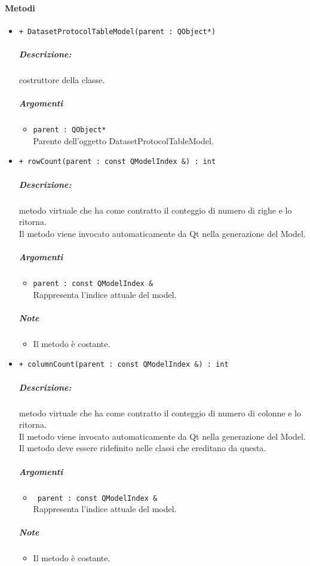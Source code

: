 \paragraph{\color{black}Metodi\\}
\begin{itemize}
	\item \color{blue}\verb!+ DatasetProtocolTableModel(parent : QObject*)!\\
		\color{black}
		\subparagraph{Descrizione:} costruttore della classe.\\
		\subparagraph{Argomenti}
			\begin{itemize}
				\item \color{RoyalPurple}\verb!parent : QObject*!\\
				\color{Black}Parente dell'oggetto DatasetProtocolTableModel.
			\end{itemize}
			
	\item \color{blue}\verb!+ rowCount(parent : const QModelIndex &) : int!\\
	\color{black}
	\subparagraph{Descrizione:} metodo virtuale che ha come contratto il conteggio di numero di righe e lo ritorna.
	\\Il metodo viene invocato automaticamente da Qt\g{} nella generazione del Model.\\
	\subparagraph{Argomenti}
		\begin{itemize}
			\item \color{RoyalPurple}\verb!parent : const QModelIndex &!\\
			\color{Black}Rappresenta l'indice attuale del model.
		\end{itemize}
	\subparagraph{Note}
			\begin{itemize}
				\item Il metodo è costante.
			\end{itemize}
	
	\item \color{blue}\verb!+ columnCount(parent : const QModelIndex &) : int!\\
	\color{black}
	\subparagraph{Descrizione:} metodo virtuale che ha come contratto il conteggio di numero di colonne e lo ritorna.\\
	Il metodo viene invocato automaticamente da Qt\g{} nella generazione del Model.\\
	Il metodo deve essere ridefinito nelle classi che ereditano da questa.\\
	\subparagraph{Argomenti}
		\begin{itemize}
			\item \color{RoyalPurple}\verb! parent : const QModelIndex &!\\
			\color{black}Rappresenta l'indice attuale del model.
		\end{itemize}
	\subparagraph{Note}
			\begin{itemize}
				\item Il metodo è costante.
			\end{itemize}
		

\end{itemize}

